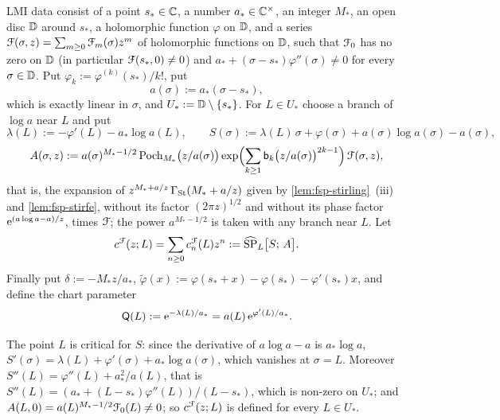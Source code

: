 \begin{defn}
\label{def:gam-lmidata}
LMI data consist of a point $s_*\in\mathbb{C}$, a number $a_*\in\mathbb{C}^\times$, an integer $M_*$, an open disc $\mathbb{D}$ around $s_*$, a holomorphic function $\varphi$ on $\mathbb{D}$, and a series $\mathcal{F}(\sigma,z)=\sum_{m\geq 0}\mathcal{F}_m(\sigma)z^m$ of holomorphic functions on $\mathbb{D}$, such that $\mathcal{F}_0$ has no zero on $\mathbb{D}$ (in particular $\mathcal{F}(s_*,0)\neq 0$) and $a_*+(\sigma-s_*)\varphi''(\sigma)\neq 0$ for every $\sigma\in\mathbb{D}$. Put $\varphi_k:=\varphi^{(k)}(s_*)/k!$, put
\[
a(\sigma):=a_*(\sigma-s_*),
\]
which is exactly linear in $\sigma$, and $U_*:=\mathbb{D}\setminus\{s_*\}$. For $L\in U_*$ choose a branch of $\log a$ near $L$ and put
\[
\lambda(L):=-\varphi'(L)-a_*\log a(L),\qquad S(\sigma):=\lambda(L)\,\sigma+\varphi(\sigma)+a(\sigma)\log a(\sigma)-a(\sigma),
\]
\[
A(\sigma,z):=a(\sigma)^{M_*-1/2}\,\mathrm{Poch}_{M_*}\bigl(z/a(\sigma)\bigr)\exp\Bigl(\sum_{k\geq 1}\mathsf{b}_k\bigl(z/a(\sigma)\bigr)^{2k-1}\Bigr)\,\mathcal{F}(\sigma,z),
\]
that is, the expansion of $z^{M_*+a/z}\,\Gamma_{\mathrm{St}}(M_*+a/z)$ given by \cref{lem:fsp-stirling}~(iii) and \cref{lem:fsp-stirfe}, without its factor $(2\pi z)^{1/2}$ and without its phase factor $\mathrm{e}^{(a\log a-a)/z}$, times $\mathcal{F}$; the power $a^{M_*-1/2}$ is taken with any branch near $L$. Let
\[
c^{\mathcal{F}}(z;L)=\sum_{n\geq 0}c^{\mathcal{F}}_n(L)z^n:=\widehat{\mathrm{SP}}_L\bigl[S;\,A\bigr].
\]
Finally put $\delta:=-M_*z/a_*$, $\tilde\varphi(x):=\varphi(s_*+x)-\varphi(s_*)-\varphi'(s_*)x$, and define the chart parameter
\[
\mathsf Q(L):=\mathrm{e}^{-\lambda(L)/a_*}=a(L)\,\mathrm{e}^{\varphi'(L)/a_*}.
\]
\end{defn}

The point $L$ is critical for $S$: since the derivative of $a\log a-a$ is $a_*\log a$, $S'(\sigma)=\lambda(L)+\varphi'(\sigma)+a_*\log a(\sigma)$, which vanishes at $\sigma=L$. Moreover $S''(L)=\varphi''(L)+a_*^2/a(L)$, that is $S''(L)=(a_*+(L-s_*)\varphi''(L))/(L-s_*)$, which is non-zero on $U_*$; and $A(L,0)=a(L)^{M_*-1/2}\mathcal{F}_0(L)\neq 0$; so $c^{\mathcal{F}}(z;L)$ is defined for every $L\in U_*$.


